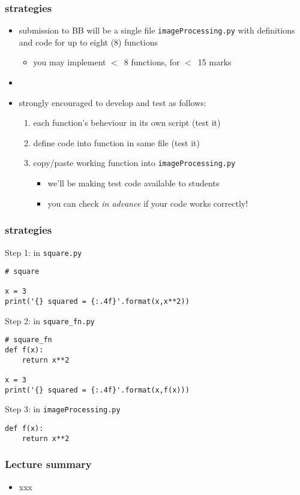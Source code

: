 \documentclass[english,14pt]{beamer}
\begin{document}

\begin{frame}[fragile]

\frametitle{strategies}

\begin{itemize}
	\item submission to BB will be a single file \texttt{imageProcessing.py} with definitions and code for up to eight (8) functions
	\begin{itemize}
		\item you may implement $<$~8 functions, for $<$~15 marks
	\end{itemize}
	\item[]
	
	\item strongly encouraged to develop and test as follows:
	\begin{enumerate}
		\item each function's beheviour in its own script (test it)
		\item define code into function in same file (test it)
		\item copy/paste working function into \texttt{imageProcessing.py}
		\begin{itemize}
			\item we'll be making test code available to students
			\item you can check \emph{in advance} if your code works correctly!
	\end{itemize}
	\end{enumerate}
\end{itemize}

\end{frame}


\begin{frame}[fragile]

\frametitle{strategies}

Step 1: in \texttt{square.py}
\begin{lstlisting}[style=CStyle,basicstyle=\scriptsize]
# square

x = 3
print('{} squared = {:.4f}'.format(x,x**2))
\end{lstlisting}

Step 2: in \texttt{square\_fn.py}
\begin{lstlisting}[style=CStyle,basicstyle=\scriptsize]
# square_fn
def f(x):
    return x**2

x = 3
print('{} squared = {:.4f}'.format(x,f(x)))
\end{lstlisting}

Step 3: in \texttt{imageProcessing.py}
\begin{lstlisting}[style=CStyle,basicstyle=\scriptsize]
def f(x):
    return x**2
\end{lstlisting}

\end{frame}


\begin{frame}[fragile]

\frametitle{Lecture summary}
\begin{itemize}
	\item xxx
\end{itemize}

\end{frame}
\end{document}
